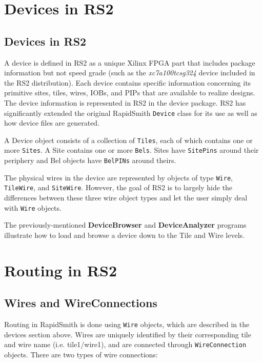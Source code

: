 \documentclass[12pt]{article}
\newcommand{\cls}[1]{{\texttt{#1}}}
\newcommand{\pgm}[1]{{\textbf{#1}}}
\begin{document}
\section{Devices in RS2}

\subsection{Devices in RS2}
A device is defined in RS2 as a unique Xilinx FPGA part that includes package
information but not speed grade (such as the {\em xc7a100tcsg324} device
included in the RS2 distribution).  Each device contains specific information concerning its
primitive sites, tiles, wires, IOBs, and PIPs that are available to realize
designs.  The device information is represented in RS2 in the device package. 
RS2 has significantly extended the original RapidSmith \cls{Device} class for
its use as well as how device files are generated.

A Device object consists of a collection of \cls{Tiles}, each of which contains
one or more \cls{Sites}.  A Site contains one or more \cls{Bels}.  Sites have
\cls{SitePins} around their periphery and Bel objects have \cls{BelPINs} around
theirs.

The physical wires in the device are represented by objects of type \cls{Wire},
\cls{TileWire}, and \cls{SiteWire}.  However, the goal of RS2 is to largely hide
the differences between these three wire object types and let the user simply deal
with \cls{Wire} objects.

The previously-mentioned \pgm{DeviceBrowser} and \pgm{DeviceAnalyzer} programs
illustrate how to load and browse a device down to the Tile and Wire levels.

\section{Routing in RS2}

\subsection{Wires and WireConnections}
Routing in RapidSmith is done using \cls{Wire} objects, which are described
in the devices section above. Wires are uniquely identified by their
corresponding tile and wire name (i.e. tile1/wire1), and are connected through
\cls{WireConnection} objects. There are two types of wire connections:
\end{document}
